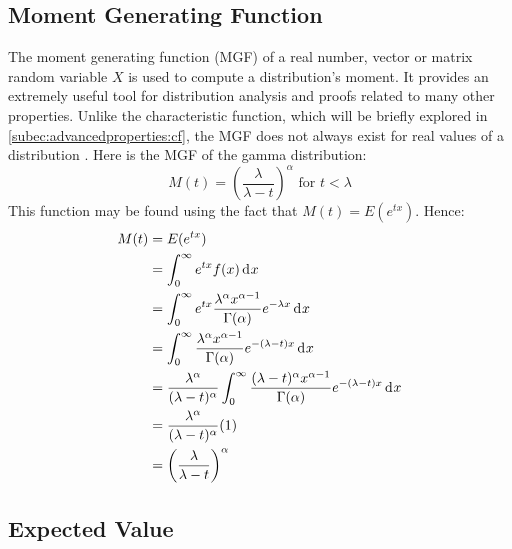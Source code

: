 \documentclass[12pt]{article}
\begin{document}
\subsection{Moment Generating Function}\label{subsec:gamma:mgf}
The moment generating function (MGF) of a real number, vector or matrix random variable $X$ is used to compute a
distribution's moment. It provides an extremely useful tool for distribution analysis and proofs related to many other
properties. Unlike the characteristic function, which will be briefly explored in \autoref{subec:advancedproperties:cf},
the MGF does not always exist for real values of a distribution \cite{wikipediaMomentgeneratingFunction2022}. Here is
the MGF of the gamma distribution:
\begin{equation}
	M(t)=\left(\frac{\lambda}{\lambda-t}\right)^\alpha\text{ for }t<\lambda
\end{equation}
This function may be found using the fact that $M(t)=E(e^{tx})$. Hence:
\begin{equation}
	\begin{split}
		M(t)	&=	E(e^{tx})\\
				&=	\int^\infty_0 e^{tx}f(x)\mathop{}\!\mathrm{d^{}}x\\
				&=	\int^\infty_0 e^{tx}\frac{\lambda^\alpha x^{\alpha-1}}{\Gamma(\alpha)}e^{-\lambda x}\mathop{}\!\mathrm{d^{}}x\\
				&=	\int^\infty_0 \frac{\lambda^\alpha x^{\alpha-1}}{\Gamma(\alpha)}e^{-(\lambda-t) x}\mathop{}\!\mathrm{d^{}}x\\
				&=	\frac{\lambda^\alpha}{(\lambda-t)^\alpha}\int^\infty_0 \frac{(\lambda-t)^\alpha x^{\alpha-1}}{\Gamma(\alpha)}e^{-(\lambda-t) x}\mathop{}\!\mathrm{d^{}}x\\
				&=	\frac{\lambda^\alpha}{(\lambda-t)^\alpha}(1)\\
				&=	\left(\frac{\lambda}{\lambda-t}\right)^\alpha
	\end{split}
\end{equation}


\pagebreak
\subsection{Expected Value}\label{subsec:gamma:expected}
\end{document}
